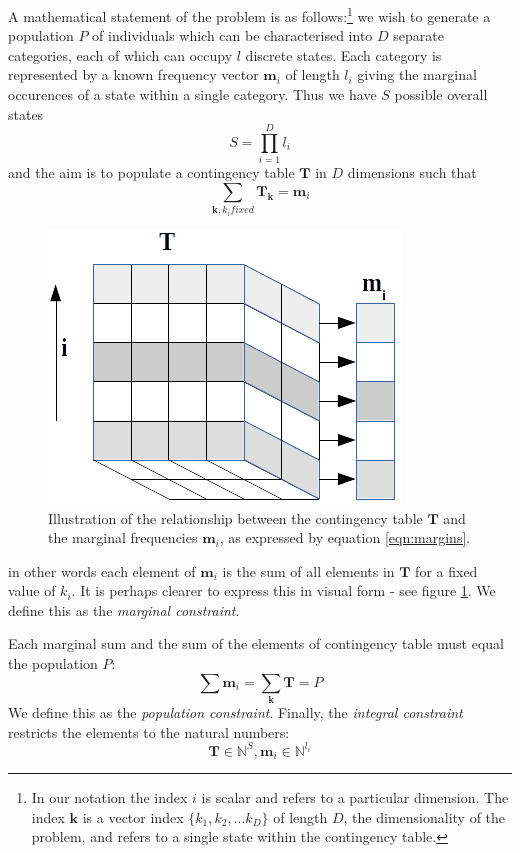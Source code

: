 \documentclass{JASSS}
\begin{document}
A mathematical statement of the problem is as
follows:\footnote{In our notation the index \(i\) is scalar and
  refers to a particular dimension. The index \(\mathbf{k}\) is a vector
  index \(\{k_1, k_2,...k_D\}\) of length \(D\), the dimensionality of
  the problem, and refers to a single state within the contingency table.}
we wish to generate a population \(P\) of individuals which can be characterised into \(D\) separate categories, 
each of which can occupy \(l\) discrete states. Each category is represented by a known frequency vector
\(\mathbf{m}_i\) of length \(l_i\) giving the marginal occurences of a state within a single category. 
Thus we have \(S\) possible overall states 
\begin{equation}
S=\prod\limits_{i=1}^{D}l_i
\end{equation}
and the aim is to populate a contingency table \(\mathbf T\) in \(D\) dimensions such that
\begin{equation}
\sum\limits_{\mathbf{k}, k_i fixed} \mathbf{T}_\mathbf{k} = \mathbf{m}_i
\label{eqn:margins}
\end{equation}
\begin{figure}[!t]
\centering
\includegraphics[width=0.35\linewidth]{figures/equation7} 
\caption{Illustration of the relationship between the contingency table \(\mathbf{T}\) and the marginal frequencies \(\mathbf{m}_i\), as expressed by equation \ref{eqn:margins}.}
\label{fig:eq7}
\end{figure} 
in other words each element of \(\mathbf{m}_i\) is the sum of all
elements in \(\mathbf{T}\) for a fixed value of \(k_i\). It is perhaps clearer to express this in visual form - see figure \ref{fig:eq7}. We define this as the \emph{marginal constraint}.

Each marginal sum and the sum of the elements of contingency table must
equal the population \(P\):
\begin{equation}
\sum\limits \mathbf{m}_{i} = \sum\limits_\mathbf{k} \mathbf{T} = P
\end{equation}
We define this as the \emph{population constraint}. 
Finally, the
\emph{integral constraint} restricts the elements to the natural
numbers:
\begin{equation}
{\mathbf{T} \in \mathbb{N}^S,\mathbf{m}_i} \in \mathbb{N}^{l_i}
\end{equation}
\end{document}
